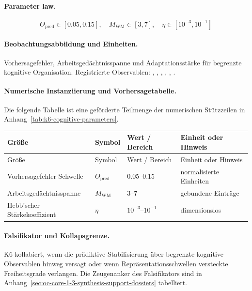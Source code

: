 \paragraph{Parameter law.}
\[
\Theta_{\mathrm{pred}} \in [0.05,0.15],\quad M_{\mathrm{WM}} \in [3,7],\quad \eta \in [10^{-3},10^{-1}]
\]

\paragraph{Beobachtungsabbildung und Einheiten.}
Vorhersagefehler, Arbeitsgedächtnisspanne und Adaptationsstärke für begrenzte kognitive Organisation.
Registrierte Observablen: , \allowbreak {}, \allowbreak {}, \allowbreak {}, \allowbreak {}, \allowbreak {}.

\paragraph{Numerische Instanziierung und Vorhersagetabelle.}
Die folgende Tabelle ist eine geförderte Teilmenge der numerischen Stützzeilen in Anhang~\ref{tab:k6-cognitive-parameters}.
\begin{longtable}{@{}L{0.27\textwidth}L{0.15\textwidth}L{0.24\textwidth}L{0.16\textwidth}@{}}
\toprule
Größe & Symbol & Wert / Bereich & Einheit oder Hinweis \\
\midrule
\endfirsthead
\toprule
Größe & Symbol & Wert / Bereich & Einheit oder Hinweis \\
\midrule
\endhead
Vorhersagefehler-Schwelle & $\scriptstyle \Theta_{\mathrm{pred}}$ & $0.05\text{--}0.15$ & normalisierte Einheiten \\
Arbeitsgedächtnisspanne & $\scriptstyle M_{\mathrm{WM}}$ & $3\text{--}7$ & gebundene Einträge \\
Hebb'scher Stärkekoeffizient & $\scriptstyle \eta$ & $10^{-3}\text{--}10^{-1}$ & dimensionslos \\
\bottomrule
\end{longtable}

\paragraph{Falsifikator und Kollapsgrenze.}
K6 kollabiert, wenn die prädiktive Stabilisierung über begrenzte kognitive Observablen hinweg versagt oder wenn Repräsentationsschwellen versteckte Freiheitsgrade verlangen.
Die Zeugenanker des Falsifikators sind in Anhang~\ref{sec:oc-core-1-3-synthesis-support-dossiers} tabelliert.

